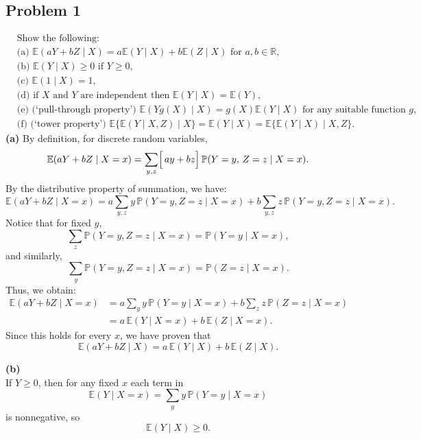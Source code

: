 \documentclass[letterpaper, 11pt]{article}
\newcommand{\1}{\mathds{1}}	%
\theoremstyle{definition}
\begin{document}
\subsection*{Problem 1}
\begin{align*}
    &\text{Show the following:}\\
    &\text{(a) } \mathbb{E}(aY + bZ \mid X) = a\mathbb{E}(Y \mid X) + b\mathbb{E}(Z \mid X) \text{ for } a, b \in \mathbb{R},\\
    &\text{(b) } \mathbb{E}(Y \mid X) \geq 0 \text{ if } Y \geq 0,\\
    &\text{(c) } \mathbb{E}(1 \mid X) = 1,\\
    &\text{(d) } \text{if } X \text{ and } Y \text{ are independent then } \mathbb{E}(Y \mid X) = \mathbb{E}(Y),\\
    &\text{(e) (`pull-through property') } \mathbb{E}(Yg(X) \mid X) = g(X)\mathbb{E}(Y \mid X) \text{ for any suitable function } g,\\
    &\text{(f) (`tower property') } \mathbb{E}\{\mathbb{E}(Y \mid X, Z) \mid X\} = \mathbb{E}(Y \mid X) = \mathbb{E}\{\mathbb{E}(Y \mid X) \mid X, Z\}.
    \end{align*}
    \textbf{(a) }  
    By definition, for discrete random variables,
    \[
    \mathbb{E}(aY+bZ \mid X=x)= \sum_{y,z} \Bigl[\,a y+b z\Bigr]\,\mathbb{P}(Y=y,\,Z=z \mid X=x).
    \]
    By the distributive property of summation, we have:
    \[
    \mathbb{E}(aY+bZ \mid X=x)= a \sum_{y,z} y\, \mathbb{P}(Y=y,Z=z \mid X=x)
    + b \sum_{y,z} z\, \mathbb{P}(Y=y,Z=z \mid X=x).
    \]
    Notice that for fixed \(y\),
    \[
    \sum_{z} \mathbb{P}(Y=y, Z=z \mid X=x)= \mathbb{P}(Y=y \mid X=x),
    \]
    and similarly,
    \[
    \sum_{y} \mathbb{P}(Y=y, Z=z \mid X=x)= \mathbb{P}(Z=z \mid X=x).
    \]
    Thus, we obtain:
    \[
    \begin{aligned}
    \mathbb{E}(aY+bZ \mid X=x) &= a \sum_{y} y\, \mathbb{P}(Y=y \mid X=x)
    + b \sum_{z} z\, \mathbb{P}(Z=z \mid X=x)\\[1ex]
    &= a\,\mathbb{E}(Y \mid X=x) + b\,\mathbb{E}(Z \mid X=x).
    \end{aligned}
    \]
    Since this holds for every \(x\), we have proven that
    \[
 {\mathbb{E}(aY+bZ \mid X)= a\,\mathbb{E}(Y \mid X) + b\,\mathbb{E}(Z \mid X).}
    \]
    
    \bigskip
    
    \textbf{(b) }\\[1ex]
    If \(Y \geq 0\), then for any fixed \(x\) each term in
    \[
    \mathbb{E}(Y \mid X=x)= \sum_{y} y \, \mathbb{P}(Y=y \mid X=x)
    \]
    is nonnegative, so
    \[
    {\mathbb{E}(Y \mid X) \geq 0.}
    \]
    
\end{document}
